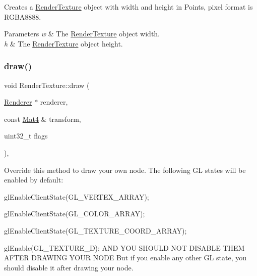 Creates a \hyperlink{classRenderTexture}{Render\+Texture} object with width and height in Points, pixel format is R\+G\+B\+A8888.


\begin{DoxyParams}{Parameters}
{\em w} & The \hyperlink{classRenderTexture}{Render\+Texture} object width. \\
\hline
{\em h} & The \hyperlink{classRenderTexture}{Render\+Texture} object height. \\
\hline
\end{DoxyParams}
\mbox{\label{classRenderTexture_a354c10ae4393f186324000e0fda6a9eb}} 
\subsubsection{\texorpdfstring{draw()}{draw()}\hspace{0.1cm}{\footnotesize\ttfamily [1/2]}}
{\footnotesize\ttfamily void Render\+Texture\+::draw (\begin{DoxyParamCaption}\item[{\hyperlink{classRenderer}{Renderer} $\ast$}]{renderer,  }\item[{const \hyperlink{classMat4}{Mat4} \&}]{transform,  }\item[{uint32\+\_\+t}]{flags }\end{DoxyParamCaption})\hspace{0.3cm}{\ttfamily [override]}, {\ttfamily [virtual]}}

Override this method to draw your own node. The following GL states will be enabled by default\+:
\begin{DoxyItemize}
\item {\ttfamily gl\+Enable\+Client\+State(\+G\+L\+\_\+\+V\+E\+R\+T\+E\+X\+\_\+\+A\+R\+R\+A\+Y);}
\item {\ttfamily gl\+Enable\+Client\+State(\+G\+L\+\_\+\+C\+O\+L\+O\+R\+\_\+\+A\+R\+R\+A\+Y);}
\item {\ttfamily gl\+Enable\+Client\+State(\+G\+L\+\_\+\+T\+E\+X\+T\+U\+R\+E\+\_\+\+C\+O\+O\+R\+D\+\_\+\+A\+R\+R\+A\+Y);}
\item {\ttfamily gl\+Enable(\+G\+L\+\_\+\+T\+E\+X\+T\+U\+R\+E\+\_\+D);} A\+ND Y\+OU S\+H\+O\+U\+LD N\+OT D\+I\+S\+A\+B\+LE T\+H\+EM A\+F\+T\+ER D\+R\+A\+W\+I\+NG Y\+O\+UR N\+O\+DE But if you enable any other GL state, you should disable it after drawing your node.
\end{DoxyItemize}


